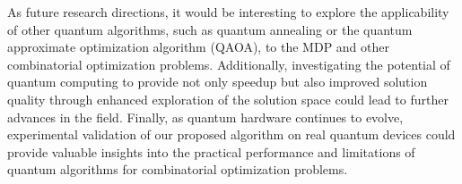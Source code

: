 As future research directions, it would be interesting to explore the applicability of other quantum algorithms, such as quantum annealing or the quantum approximate optimization algorithm (QAOA), to the MDP and other combinatorial optimization problems. Additionally, investigating the potential of quantum computing to provide not only speedup but also improved solution quality through enhanced exploration of the solution space could lead to further advances in the field. Finally, as quantum hardware continues to evolve, experimental validation of our proposed algorithm on real quantum devices could provide valuable insights into the practical performance and limitations of quantum algorithms for combinatorial optimization problems.

